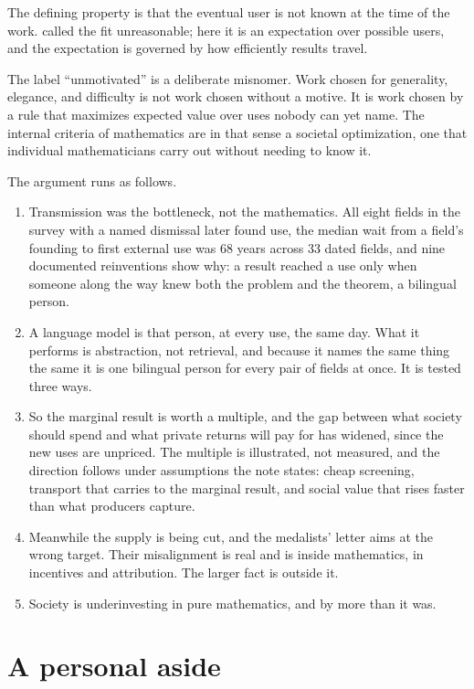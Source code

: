 \documentclass[11pt]{article}
\theoremstyle{definition}
\theoremstyle{remark}
\begin{document}
The defining property is that the eventual user is not known at the time of the work. \citet{wigner1960} called the fit unreasonable; here it is an expectation over possible users, and the expectation is governed by how efficiently results travel.

The label ``unmotivated'' is a deliberate misnomer. Work chosen for generality, elegance, and difficulty is not work chosen without a motive. It is work chosen by a rule that maximizes expected value over uses nobody can yet name. The internal criteria of mathematics are in that sense a societal optimization, one that individual mathematicians carry out without needing to know it.

The argument runs as follows.
\begin{enumerate}
\item Transmission was the bottleneck, not the mathematics. All eight fields in the survey with a named dismissal later found use, the median wait from a field's founding to first external use was 68 years across 33 dated fields, and nine documented reinventions show why: a result reached a use only when someone along the way knew both the problem and the theorem, a bilingual person.
\item A language model is that person, at every use, the same day. What it performs is abstraction, not retrieval, and because it names the same thing the same it is one bilingual person for every pair of fields at once. It is tested three ways.
\item So the marginal result is worth a multiple, and the gap between what society should spend and what private returns will pay for has widened, since the new uses are unpriced. The multiple is illustrated, not measured, and the direction follows under assumptions the note states: cheap screening, transport that carries to the marginal result, and social value that rises faster than what producers capture.
\item Meanwhile the supply is being cut, and the medalists' letter aims at the wrong target. Their misalignment is real and is inside mathematics, in incentives and attribution. The larger fact is outside it.
\item Society is underinvesting in pure mathematics, and by more than it was.
\end{enumerate}

\section{A personal aside}
\end{document}

